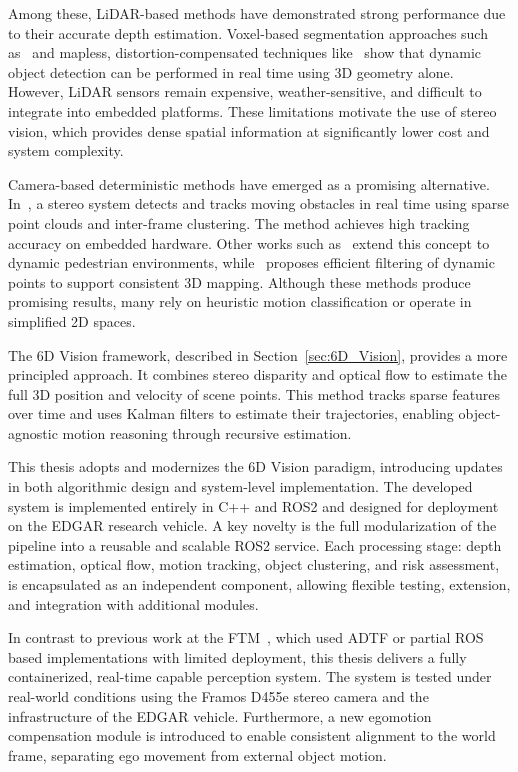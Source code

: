Among these, LiDAR-based methods have demonstrated strong performance due to
their accurate depth estimation. Voxel-based segmentation approaches such as~\cite{asvadi_3d_2016} and mapless, distortion-compensated techniques like~\cite{yoon_mapless_2018} show that dynamic object detection can be performed
in real time using 3D geometry alone. However, LiDAR sensors remain expensive,
weather-sensitive, and difficult to integrate into embedded platforms. These
limitations motivate the use of stereo vision, which provides dense spatial
information at significantly lower cost and system complexity.

Camera-based deterministic methods have emerged as a promising alternative.
In~\cite{eppenberger_leveraging_2020}, a stereo system detects and tracks
moving obstacles in real time using sparse point clouds and inter-frame
clustering. The method achieves high tracking accuracy on embedded hardware.
Other works such as~\cite{ess_moving_2009} extend this concept to dynamic
pedestrian environments, while~\cite{shi_dynamic_2018} proposes efficient
filtering of dynamic points to support consistent 3D mapping. Although these
methods produce promising results, many rely on heuristic motion classification
or operate in simplified 2D spaces.

The 6D Vision framework, described in Section~\ref{sec:6D_Vision}, provides a
more principled approach. It combines stereo disparity and optical flow to
estimate the full 3D position and velocity of scene points. This method tracks
sparse features over time and uses Kalman filters to estimate their
trajectories, enabling object-agnostic motion reasoning through recursive
estimation.

This thesis adopts and modernizes the 6D Vision paradigm, introducing updates
in both algorithmic design and system-level implementation. The developed
system is implemented entirely in C++ and ROS2 and designed for deployment on
the EDGAR research vehicle. A key novelty is the full modularization of the
pipeline into a reusable and scalable ROS2 service. Each processing stage: depth
estimation, optical flow, motion tracking, object clustering, and risk
assessment, is encapsulated as an independent component, allowing flexible
testing, extension, and integration with additional modules.

In contrast to previous work at the FTM~\cite{previous_tfm_bauer,
previous_tfm_gpu_implementation, previous_tfm_pastor}, which used ADTF or
partial ROS based implementations with limited deployment, this thesis
delivers a fully containerized, real-time capable perception system. The system
is tested under real-world conditions using the Framos D455e stereo camera and
the infrastructure of the EDGAR vehicle. Furthermore, a new
egomotion compensation module is introduced to enable consistent alignment to
the world frame, separating ego movement from external object motion.

